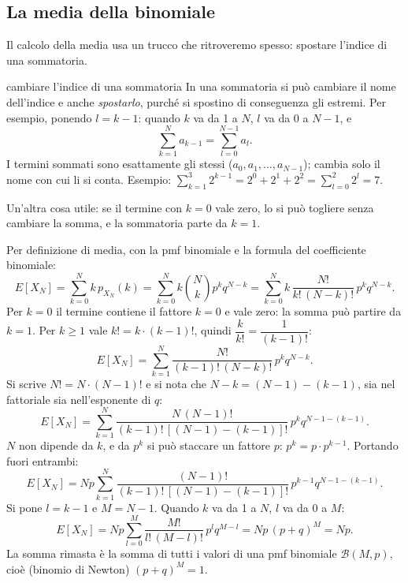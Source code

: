 \subsection{La media della binomiale}

Il calcolo della media usa un trucco che ritroveremo spesso: spostare l'indice di una sommatoria.

\begin{richiamo}{cambiare l'indice di una sommatoria}
In una sommatoria si può cambiare il nome dell'indice e anche \emph{spostarlo}, purché si spostino di conseguenza gli
estremi. Per esempio, ponendo $l = k - 1$: quando $k$ va da 1 a $N$, $l$ va da 0 a $N - 1$, e
\[ \sum_{k=1}^{N} a_{k-1} = \sum_{l=0}^{N-1} a_l . \]
I termini sommati sono esattamente gli stessi ($a_0, a_1, \ldots, a_{N-1}$); cambia solo il nome con cui li si
conta. Esempio: $\sum_{k=1}^{3} 2^{k-1} = 2^0 + 2^1 + 2^2 = \sum_{l=0}^{2} 2^l = 7$.

Un'altra cosa utile: se il termine con $k = 0$ vale zero, lo si può togliere senza cambiare la somma, e la
sommatoria parte da $k = 1$.
\end{richiamo}


\begin{dimostrazione}
 Per definizione di media, con la pmf binomiale e la formula del coefficiente
binomiale:
\[ E[X_N] = \sum_{k=0}^{N} k\, p_{X_N}(k) = \sum_{k=0}^{N} k \binom{N}{k} p^k q^{N-k}
          = \sum_{k=0}^{N} k\, \frac{N!}{k!\,(N-k)!}\, p^k q^{N-k} . \]
 Per $k = 0$ il termine contiene il fattore $k = 0$ e vale zero: la somma può partire
da $k = 1$.
 Per $k \geq 1$ vale $k! = k \cdot (k-1)!$, quindi $\dfrac{k}{k!} = \dfrac{1}{(k-1)!}$:
\[ E[X_N] = \sum_{k=1}^{N} \frac{N!}{(k-1)!\,(N-k)!}\, p^k q^{N-k} . \]
 Si scrive $N! = N \cdot (N-1)!$ e si nota che $N - k = (N-1) - (k-1)$, sia nel
fattoriale sia nell'esponente di $q$:
\[ E[X_N] = \sum_{k=1}^{N} \frac{N\,(N-1)!}{(k-1)!\,[(N-1)-(k-1)]!}\, p^k q^{N-1-(k-1)} . \]
 $N$ non dipende da $k$, e da $p^k$ si può staccare un fattore $p$: $p^k = p \cdot
p^{k-1}$. Portando fuori entrambi:
\[ E[X_N] = N p \sum_{k=1}^{N} \frac{(N-1)!}{(k-1)!\,[(N-1)-(k-1)]!}\, p^{k-1} q^{N-1-(k-1)} . \]
 Si pone $l = k - 1$ e $M = N - 1$. Quando $k$ va da 1 a $N$, $l$ va da 0 a $M$:
\[ E[X_N] = N p \sum_{l=0}^{M} \frac{M!}{l!\,(M-l)!}\, p^l q^{M-l} = N p\, (p + q)^M = N p . \]
La somma rimasta è la somma di tutti i valori di una pmf binomiale $\mathcal{B}(M, p)$, cioè (binomio di Newton)
$(p + q)^M = 1$.
\end{dimostrazione}

